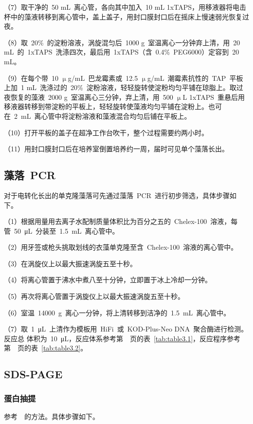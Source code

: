 （7）取干净的\ 50 mL\ 离心管，各向其中加入\ 10 mL 1xTAPS，用移液器将电击杯中的藻液转移到离心管中，盖上盖子，用封口膜封口后在摇床上慢速弱光恢复过夜。

（8）取\ 20\%\ 的淀粉溶液，涡旋混匀后\ 1000 g\ 室温离心一分钟弃上清，用\ 20 mL\ 的\ 1xTAPS\ 洗涤四次，最后用\ 1xTAPS（含\ 0.4\%\ PEG6000）定容到\ 20 mL。

（9）在每个带\ 10 $\upmu$g/mL\ 巴龙霉素或\ 12.5 $\upmu$g/mL\ 潮霉素抗性的\ TAP\ 平板上加\ 1 mL\ 洗涤过的\ 20\%\ 淀粉溶液，轻轻旋转使淀粉均匀平铺在琼脂上。取过夜恢复的藻液\ 2000 g\ 室温离心三分钟，弃上清，用\ 500 $\upmu$L 1xTAPS\ 重悬后用移液器转移到带淀粉的平板上，轻轻旋转使藻液均匀平铺在淀粉上。也可在\ \SI{2}{\mL}\ 离心管中将淀粉溶液和藻液混合均匀后铺在平板上。

（10）打开平板的盖子在超净工作台吹干，整个过程需要约两小时。

（11）用封口膜封口后在培养室倒置培养约一周，届时可见单个藻落长出。

\subsection{藻落\ PCR}
对于电转化长出的单克隆藻落可先通过藻落\ PCR\ 进行初步筛选，具体步骤如下。

（1）根据用量用去离子水配制质量体积比为百分之五的\ Chelex-100\ 溶液，每管\ \SI{50}{\uL}\ 分装至\ \SI{1.5}{\mL}\ 离心管中。

（2）用牙签或枪头挑取划线的衣藻单克隆至含\ Chelex-100\ 溶液的离心管中。

（3）在涡旋仪上以最大振速涡旋五至十秒。

（4）将离心管置于沸水中煮八至十分钟，立即置于冰上冷却一分钟。

（5）再次将离心管置于涡旋仪上以最大振速涡旋五至十秒。

（6）室温\ \SI{14000}{\g}\ 离心一分钟，将上清转移到洁净的\ \SI{1.5}{\mL}\ 离心管中。

（7）取\ \SI{1}{\uL}\ 上清作为模板用\ HiFi\ 或\ KOD-Plus-Neo DNA\ 聚合酶进行检测。反应总
体积为\ \SI{10}{\uL}，反应体系参考第\ \pageref{tab:table3.1}\ 页的表\ \ref{tab:table3.1}，反应程序参考第\ \pageref{tab:table3.2}\ 页的表\ \ref{tab:table3.2}。

\subsection{SDS-PAGE}\label{subsec:SDS-PAGE}
\subsubsection{蛋白抽提}
参考\ \citet{Hu2014}\ 的方法。具体步骤如下。

